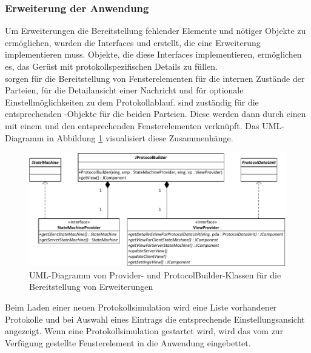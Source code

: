 \subsubsection{Erweiterung der Anwendung}
Um Erweiterungen die Bereitstellung fehlender Elemente und nötiger Objekte zu ermöglichen, wurden die Interfaces  und  erstellt, die eine Erweiterung implementieren muss. Objekte, die diese Interfaces implementieren, ermöglichen es, das Gerüst mit protokollspezifischen Details zu füllen.\\
 sorgen für die Bereitstellung von Fensterelementen für die internen Zustände der Parteien, für die Detailansicht einer Nachricht und für optionale Einstellmöglichkeiten zu dem Protokollablauf.  sind zuständig für die entsprechenden -Objekte für die beiden Parteien. Diese werden dann durch einen  mit einem  und den entsprechenden Fensterelementen verknüpft. Das UML-Diagramm in Abbildung \ref{fig_uml_abstract_provider_builder} visualisiert diese Zusammenhänge. 

\begin{figure}
	\centering
	\includegraphics[scale=0.9]{Diagrams/uml/abstract_provider_builder.pdf} %
	\caption{UML-Diagramm von Provider- und ProtocolBuilder-Klassen für die Bereitstellung von Erweiterungen}
	\label{fig_uml_abstract_provider_builder}
\end{figure}

Beim Laden einer neuen Protokollsimulation wird eine Liste vorhandener Protokolle und bei Auswahl eines Eintrags die entsprechende Einstellungsansicht angezeigt. Wenn eine Protokollsimulation gestartet wird, wird das vom  zur Verfügung gestellte Fensterelement in die Anwendung eingebettet.

